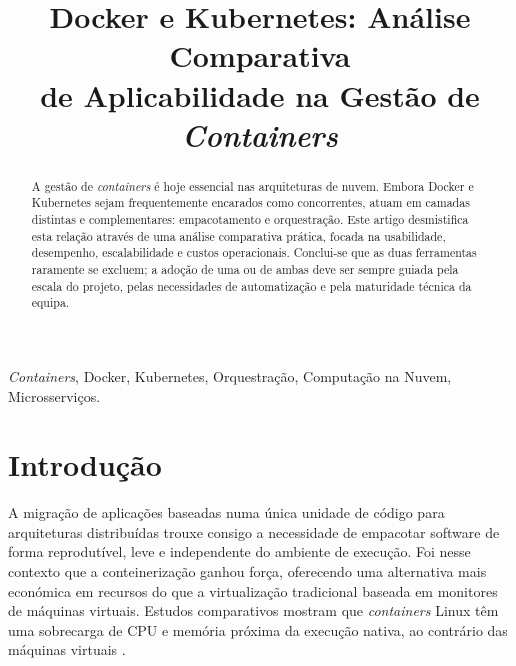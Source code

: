 \documentclass[conference]{IEEEtran}
\begin{document}
\title{Docker e Kubernetes: Análise Comparativa\\ de Aplicabilidade na Gestão de \textit{Containers}}

\author{
\and
{}
}

\maketitle

\begin{abstract}
A gestão de \textit{containers} é hoje essencial nas arquiteturas de nuvem. Embora Docker e Kubernetes sejam frequentemente encarados como concorrentes, atuam em camadas distintas e complementares: empacotamento e orquestração. Este artigo desmistifica esta relação através de uma análise comparativa prática, focada na usabilidade, desempenho, escalabilidade e custos operacionais. Conclui-se que as duas ferramentas raramente se excluem; a adoção de uma ou de ambas deve ser sempre guiada pela escala do projeto, pelas necessidades de automatização e pela maturidade técnica da equipa.
\end{abstract}

\begin{IEEEkeywords}
\textit{Containers}, Docker, Kubernetes, Orquestração, Computação na Nuvem, Microsserviços.
\end{IEEEkeywords}

\section{Introdução}
A migração de aplicações baseadas numa única unidade de código para arquiteturas distribuídas trouxe consigo a necessidade de empacotar software de forma reprodutível, leve e independente do ambiente de execução. Foi nesse contexto que a conteinerização ganhou força, oferecendo uma alternativa mais económica em recursos do que a virtualização tradicional baseada em monitores de máquinas virtuais. Estudos comparativos mostram que \textit{containers} Linux têm uma sobrecarga de CPU e memória próxima da execução nativa, ao contrário das máquinas virtuais \cite{bernstein2014,merkel2014,felter2015}.
\end{document}
